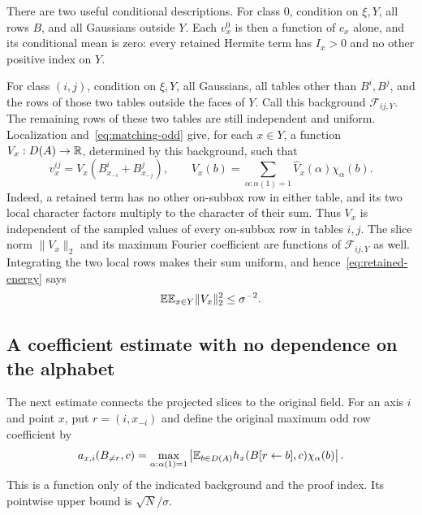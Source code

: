 There are two useful conditional descriptions. For class $0$, condition
on $\xi,Y$, all rows $B$, and all Gaussians outside $Y$. Each $v^0_x$
is then a function of $c_x$ alone, and its conditional mean is zero:
every retained Hermite term has $I_x>0$ and no other positive index
on $Y$.

For class $(i,j)$, condition on $\xi,Y$, all Gaussians, all tables
other than $B^i,B^j$, and the rows of those two tables outside the faces
of $Y$. Call this background $\mathcal F_{ij,Y}$. The remaining rows
of these two tables are still independent and uniform. Localization
and~\eqref{eq:matching-odd} give, for each $x\in Y$, a function
$V_x:D(A)\to\mathbb R$, determined by this background, such that
\begin{equation}\label{eq:local-sum-slice}
 v^{ij}_x=V_x(B^i_{x_{-i}}+B^j_{x_{-j}}),
 \qquad
 V_x(b)=\sum_{\alpha:\alpha(1)=1}\widehat V_x(\alpha)\chi_\alpha(b).
\end{equation}
Indeed, a retained term has no other on-subbox row in either table,
and its two local character factors multiply to the character of their
sum. Thus $V_x$ is independent of the sampled values of every
on-subbox row in tables $i,j$. The slice norm
$\|V_x\|_2$ and its maximum Fourier coefficient are functions of
$\mathcal F_{ij,Y}$ as well. Integrating the two local rows makes
their sum uniform, and hence~\eqref{eq:retained-energy} says
\begin{equation}\label{eq:slice-energy}
 \mathbb E\mathbb E_{x\in Y}\|V_x\|_2^2\le\sigma^{-2}.
\end{equation}

\subsection{A coefficient estimate with no dependence on the alphabet}

The next estimate connects the projected slices to the original field.
For an axis $i$ and point $x$, put $r=(i,x_{-i})$ and define the
original maximum odd row coefficient by
\[
 a_{x,i}(B_{\ne r},c)=
 \max_{\alpha:\alpha(1)=1}
 \left|\mathbb E_{b\in D(A)}h_x(B[r\leftarrow b],c)\chi_\alpha(b)\right|.
\]
This is a function only of the indicated background and the proof
index. Its pointwise upper bound is $\sqrt N/\sigma$.

